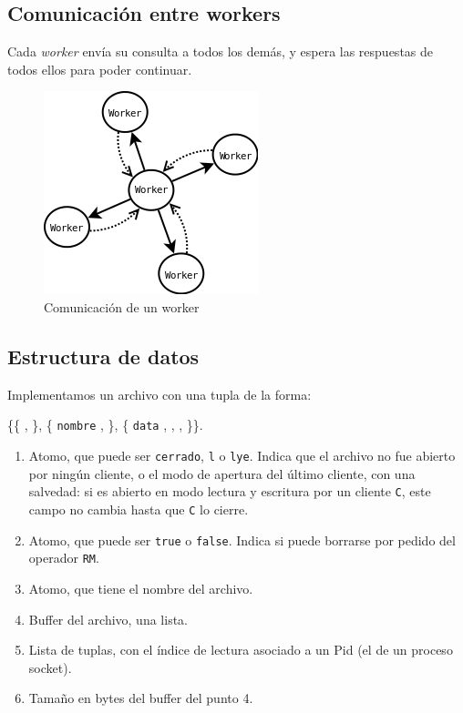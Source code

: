 \documentclass[a4paper, 8pt]{article}
\begin{document}
  \subsection{Comunicación entre workers}
  Cada \textit{worker} envía su consulta a todos los demás, y espera las respuestas de todos ellos para poder continuar.
  
 \begin{figure}[htbp]
   \centering
     \includegraphics[scale=0.75]{dia2}
     \caption{Comunicación de un worker}
   \label{Figura 2}
 \end{figure}
  
  
\subsection{Estructura de datos}

  Implementamos un archivo con una tupla de la forma:

\vspace{2.5mm}

\{\{  ,  \}, \{ \texttt{nombre} ,  \}, \{ \texttt{data} ,  ,  ,  \}\}.

\vspace{2.5mm}

\begin{enumerate}
  \item Atomo, que puede ser \texttt{cerrado}, \texttt{l} o \texttt{lye}. Indica que el archivo no fue abierto por ningún cliente, o el modo de apertura del último cliente,
  con una salvedad:  si es abierto en modo lectura y escritura por un cliente \texttt{C}, este campo no cambia hasta que \texttt{C} lo cierre.
  \item Atomo, que puede ser \texttt{true} o \texttt{false}. Indica si puede borrarse por pedido del operador \texttt{RM}.
  \item Atomo, que tiene el nombre del archivo.
  \item Buffer del archivo, una lista.
  \item Lista de tuplas, con el índice de lectura asociado a un Pid (el de un proceso socket).
  \item Tamaño en bytes del buffer del punto 4.
\end{enumerate}
\end{document}
